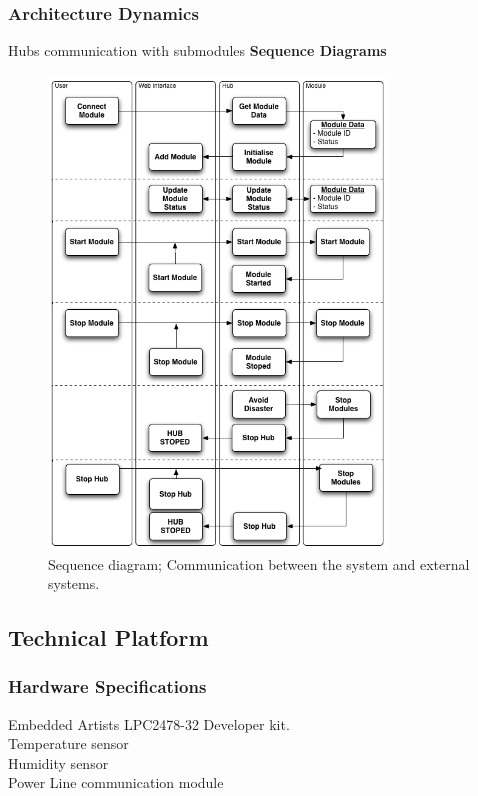 	\subsubsection{Architecture Dynamics}
		Hubs communication with submodules
		\textbf{Sequence Diagrams}
		\begin{figure}[h!]		%
			\begin{centering}
				 \includegraphics[width=0.8\textwidth]{images/SequenceDiagram.png}
				\caption{Sequence diagram; Communication between the system and external systems.}
		 	\end{centering}
		\end{figure}	
\subsection{Technical Platform}

	\subsubsection{Hardware Specifications}
	Embedded Artists LPC2478-32 Developer kit.
	\\Temperature sensor
	\\Humidity sensor
	\\Power Line communication module
